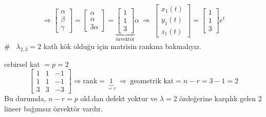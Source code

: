 \documentclass[11pt,a4paper]{article}
\begin{document}
\begin{cozum}
\[\Rightarrow \begin{bmatrix} \alpha \\ \beta \\ \gamma \end{bmatrix} = \begin{bmatrix} \alpha \\ \alpha \\ 3\alpha \end{bmatrix} = \underbrace{\begin{bmatrix} 1 \\ 1 \\ 3 \end{bmatrix}}_{\text{özvektör}}\alpha \ \Rightarrow \ \begin{bmatrix} x_1(t) \\ y_1(t) \\ z_1(t) \end{bmatrix} = \begin{bmatrix} 1 \\ 1 \\ 3 \end{bmatrix}e^{t}
\]
\# \ $\lambda_{2,3} = 2$ katlı kök olduğu için matrisin rankına bakmalıyız.

cebirsel kat $= p = 2$
\[
\begin{bmatrix} 1 & 1 & -1 \\ 1 & 1 & -1 \\ 3 & 3 & -3 \end{bmatrix} \Rightarrow \mathrm{rank} = \underbrace{1}_{=r} \ \Rightarrow \ \text{geometrik kat} = n-r = 3-1 = 2
\]
Bu durumda, $n-r=p$ old.dan defekt yoktur ve $\lambda=2$ özdeğerine karşılık gelen 2 lineer bağımsız özvektör vardır.


\end{cozum}
\end{document}
